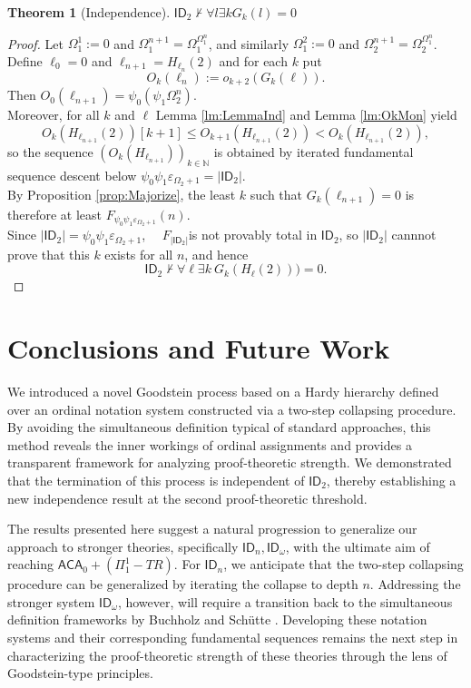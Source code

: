 \documentclass{amsart}
\theoremstyle{plain}
\theoremstyle{plain}
\newtheorem{theorem}{Theorem}
\newcommand{\ID}{\mathsf{ID}}
\newcommand{\ACA}{\mathsf{ACA}}
\newcommand{\Om}{{\Omega}}
\newcommand{\om}{\omega}
\newcommand\Nat{\mathbb{N}}
\begin{document}
\begin{theorem}[Independence]
$\ID_2 \not\vdash \forall l \exists k G_k(l)=0$
\end{theorem}
\begin{proof}
Let $\Om^1_1:=0$ and $\Om_1^{n+1} =\Om_1^{\Om^n_1}$, and similarly $\Om^2_1:=0$ and $\Om_2^{n+1} =\Om_2^{\Om^n_1}$.\smallskip
\\
Define $\ell_0=0$ and $\ell_{n+1} =H_{\ell_n}(2)$ and for each $k$ put
$$O_k(\ell_n) := o_{k+2}(G_{k}(\ell)).$$
Then $O_0 (\ell_{n+1}) = \psi_0(\psi_1\Om_2^n)$.\smallskip
\\
Moreover, for all $k$ and $\ell$ Lemma \ref{lm:LemmaInd} and Lemma \ref{lm:OkMon} yield 
$$O_k(H_{\ell_{n+1}} (2))[k+1] \leq O_{k+1}(H_{\ell_{n+1}} (2) ) < O_k (H_{\ell_{n+1}} (2)  ),$$
so the sequence $(O_k (H_{\ell_{n+1}}))_{k\in \Nat}$ is obtained by iterated fundamental sequence descent below $\psi_0\psi_1\varepsilon_{\Om_2+1} = |\ID_2|$.\smallskip
\\
By Proposition \ref{prop:Majorize}, the least $k$ such that $G_k(\ell_{n+1})=0$ is therefore at least $F_{\psi_0\psi_1\varepsilon_{\Om_2+1}}(n)$.\smallskip
\\
Since $|{\ID}_2| = \psi_0\psi_1\varepsilon_{\Om_2+1}$,~~
$F_{|\ID_2|}$is not provably total in ${\ID}_2$, so $|\ID_2|$
cannnot prove that this $k$ exists for all $n$, and hence
$${\ID}_2\not \vdash \forall \ell \exists k \ G_k(H_\ell (2)))=0.$$

\end{proof}




\section{Conclusions and Future Work}
We introduced a novel Goodstein process based on a Hardy hierarchy defined over an ordinal notation system constructed via a two-step collapsing procedure. By avoiding the simultaneous definition typical of standard approaches, this method reveals the inner workings of ordinal assignments and provides a transparent framework for analyzing proof-theoretic strength. We demonstrated that the termination of this process is independent of $\ID_2$, thereby establishing a new independence result at the second proof-theoretic threshold.

The results presented here suggest a natural progression to generalize our approach to stronger theories, specifically $ \ID_n, \ID_\om$, with the ultimate aim of reaching $\ACA_0 +(\Pi_1^1-TR)$.
For $\ID_n$, we anticipate that the two-step collapsing procedure can be generalized by iterating the collapse to depth $n$. Addressing the stronger system $\ID_\omega$, however, will require a transition back to the simultaneous definition frameworks by Buchholz and Sch\"utte \cite{BuchholzSchutte}. Developing these notation systems and their corresponding fundamental sequences remains the next step in characterizing the proof-theoretic strength of these theories through the lens of Goodstein-type principles.



\end{document}
